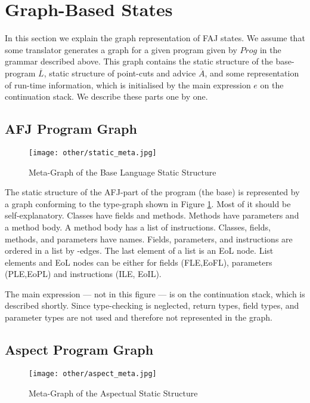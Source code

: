 \section{Graph-Based States}
\label{sec:gr-state}

In this section we explain the graph representation of FAJ states. We assume
that some translator generates a graph for a given program given by $Prog$ in
the grammar described above. This graph contains the static structure of the
base-program $\overline{L}$, static structure of point-cuts and advice
$\overline{A}$, and some representation of run-time information, which is
initialised by the main expression $e$ on the continuation stack. We describe
these parts one by one.

\subsection{AFJ Program Graph}

\begin{figure}
	\begin{center}
		\texttt{[image: other/static\_meta.jpg]}
	\end{center}
  \caption{Meta-Graph of the Base Language Static Structure}
	\label{fig:staticmeta}
\end{figure}

The static structure of the AFJ-part of the program (the base) is represented
by a graph conforming to the type-graph shown in Figure \ref{fig:staticmeta}.
Most of it should be self-explanatory. Classes have fields and methods. Methods
have parameters and a method body. A method body has a list of instructions.
Classes, fields, methods, and parameters have names. Fields, parameters, and
instructions are ordered in a list by \nextL-edges. The last element of a
list is an EoL node. List elements and EoL nodes can be either for fields (FLE,EoFL), parameters (PLE,EoPL) and instructions (ILE, EoIL).

The main expression --- not in this figure --- is on the
continuation stack, which is described shortly. Since type-checking is
neglected, return types, field types, and parameter types are not used and
therefore not represented in the graph.

\subsection{Aspect Program Graph}

\begin{figure}
	\begin{center}
		\texttt{[image: other/aspect\_meta.jpg]}
	\end{center}
		\caption{Meta-Graph of the Aspectual Static Structure}
	\label{fig:meta_aspect}
\end{figure}


